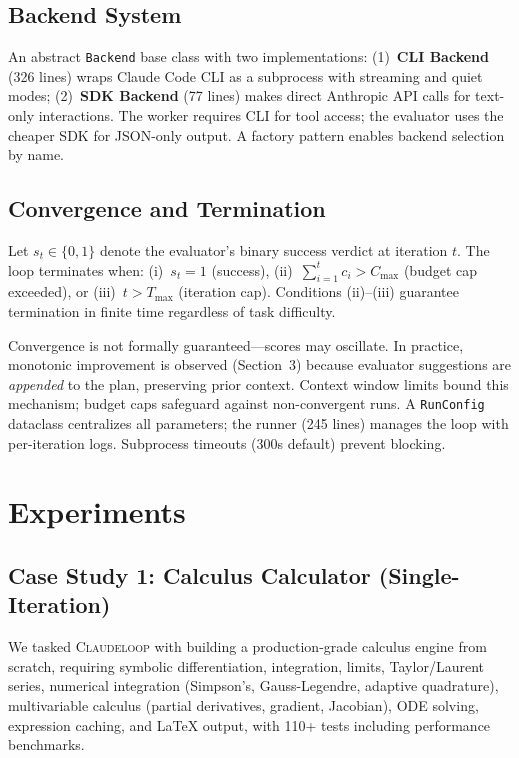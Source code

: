 \documentclass{article}
\begin{document}
\subsection{Backend System}

An abstract \texttt{Backend} base class with two implementations: (1)~\textbf{CLI Backend} (326 lines) wraps Claude Code CLI as a subprocess with streaming and quiet modes; (2)~\textbf{SDK Backend} (77 lines) makes direct Anthropic API calls for text-only interactions. The worker requires CLI for tool access; the evaluator uses the cheaper SDK for JSON-only output. A factory pattern enables backend selection by name.

\subsection{Convergence and Termination}

Let $s_t \in \{0, 1\}$ denote the evaluator's binary success verdict at iteration $t$. The loop terminates when: (i)~$s_t = 1$ (success), (ii)~$\sum_{i=1}^{t} c_i > C_{\max}$ (budget cap exceeded), or (iii)~$t > T_{\max}$ (iteration cap). Conditions (ii)--(iii) guarantee termination in finite time regardless of task difficulty.

Convergence is not formally guaranteed---scores may oscillate. In practice, monotonic improvement is observed (Section~3) because evaluator suggestions are \emph{appended} to the plan, preserving prior context. Context window limits bound this mechanism; budget caps safeguard against non-convergent runs. A \texttt{RunConfig} dataclass centralizes all parameters; the runner (245 lines) manages the loop with per-iteration logs. Subprocess timeouts (300s default) prevent blocking.

\section{Experiments}

\subsection{Case Study 1: Calculus Calculator (Single-Iteration)}

We tasked \textsc{Claudeloop} with building a production-grade calculus engine from scratch, requiring symbolic differentiation, integration, limits, Taylor/Laurent series, numerical integration (Simpson's, Gauss-Legendre, adaptive quadrature), multivariable calculus (partial derivatives, gradient, Jacobian), ODE solving, expression caching, and LaTeX output, with 110+ tests including performance benchmarks.
\end{document}
